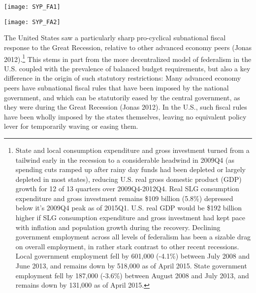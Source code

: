 \documentclass[12pt,letterpaper]{article}
\begin{document}
\begin{center}
\texttt{[image: SYP\_FA1]}
\end{center}

\begin{center}
\texttt{[image: SYP\_FA2]}
\end{center}

The United States saw a particularly sharp pro-cyclical subnational fiscal response to the Great Recession, relative to other advanced economy peers (Jonas 2012).\footnote{State and local consumption expenditure and gross investment turned from a tailwind early in the recession to a considerable headwind in 2009Q4 (as spending cuts ramped up after rainy day funds had been depleted or largely depleted in most states), reducing U.S. real gross domestic product (GDP) growth for 12 of 13 quarters over 2009Q4-2012Q4. Real SLG consumption expenditure and gross investment remains \$109 billion (5.8\%) depressed below it's 2009Q4 peak as of 2015Q1. U.S. real GDP would be \$192 billion higher if SLG consumption expenditure and gross investment had kept pace with inflation and population growth during the recovery. Declining government employment across all levels of federalism has been a sizable drag on overall employment, in rather stark contrast to other recent recessions. Local government employment fell by 601,000 (-4.1\%) between July 2008 and June 2013, and remains down by 518,000 as of April 2015. State government employment fell by 187,000 (-3.6\%) between August 2008 and July 2013, and remains down by 131,000 as of April 2015.} This stems in part from the more decentralized model of federalism in the U.S. coupled with the prevalence of balanced budget requirements, but also a key difference in the origin of such statutory restrictions: Many advanced economy peers have subnational fiscal rules that have been imposed by the national government, and which can be statutorily eased by the central government, as they were during the Great Recession (Jonas 2012). In the U.S., such fiscal rules have been wholly imposed by the states themselves, leaving no equivalent policy lever for temporarily waving or easing them.
\end{document}
